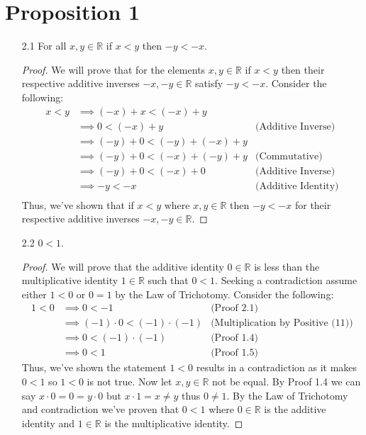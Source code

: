 \documentclass[12pt, letterpaper]{article}
\theoremstyle{plain}
\theoremstyle{definition}
\theoremstyle{remark}
\begin{document}
\section{Proposition 1} %
\begin{itemize}
    
\item[2.1] For all $x,y\in\mathbb{R}$ if $x<y$ then $-y<-x$.
\begin{proof}
We will prove that for the elements $x,y\in\mathbb{R}$ if $x<y$ then their respective additive inverses $-x,-y\in\mathbb{R}$ satisfy $-y<-x$. Consider the following:
\begin{align*}
    x<y &\implies (-x)+x < (-x)+y \\
        &\implies 0 < (-x)+y            &\text{(Additive Inverse)} \\
        &\implies (-y)+0 < (-y)+(-x)+y \\
        &\implies (-y)+0 < (-x)+(-y)+y  &\text{(Commutative)} \\
        &\implies (-y)+0 < (-x)+0       &\text{(Additive Inverse)} \\
        &\implies -y < -x               &\text{(Additive Identity)} \\
\end{align*}
Thus, we've shown that if $x<y$ where $x,y\in\mathbb{R}$ then $-y<-x$ for their respective additive inverses $-x,-y\in\mathbb{R}$.
\end{proof}

\item[2.2] $0<1$.
\begin{proof}
We will prove that the additive identity $0\in\mathbb{R}$ is less than the multiplicative identity $1\in\mathbb{R}$ such that $0<1$. Seeking a contradiction assume either $1<0$ or $0=1$ by the Law of Trichotomy. Consider the following:
\begin{align*}
    1<0 &\implies 0<-1                      &\text{(Proof 2.1)} \\
        &\implies (-1)\cdot 0<(-1)\cdot(-1) &\text{(Multiplication by Positive (11))} \\
        &\implies 0<(-1)\cdot (-1)          &\text{(Proof 1.4)} \\
        &\implies 0<1                       &\text{(Proof 1.5)}
\end{align*}
Thus, we've shown the statement $1<0$ results in a contradiction as it makes $0<1$ so $1<0$ is not true. Now let $x,y\in\mathbb{R}$ not be equal. By Proof 1.4 we can say $x\cdot 0=0=y\cdot 0$ but $x\cdot 1=x\ne y$ thus $0\ne 1$. By the Law of Trichotomy and contradiction we've proven that $0<1$ where $0\in\mathbb{R}$ is the additive identity and $1\in\mathbb{R}$ is the multiplicative identity.
\end{proof}


\end{itemize}
\end{document}

